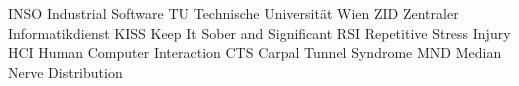 	{INSO}	{Industrial Software}
	{TU}	{Technische Universit\"at Wien}
	{ZID}	{Zentraler Informatikdienst}
	{KISS}	{Keep It Sober and Significant}
	{RSI}	{Repetitive Stress Injury}
	{HCI}	{Human Computer Interaction}
   {CTS}   {Carpal Tunnel Syndrome}
   {MND}   {Median Nerve Distribution}
